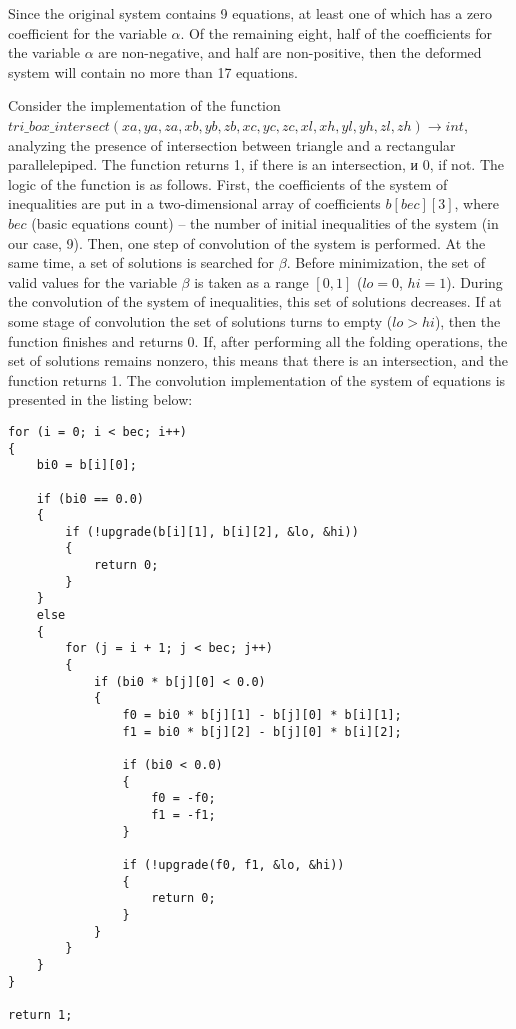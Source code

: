 \documentclass[
11pt,%
tightenlines,%
twoside,%
onecolumn,%
nofloats,%
nobibnotes,%
nofootinbib,%
superscriptaddress,%
noshowpacs,%
centertags]%
{revtex4}
\begin{document}
Since the original system contains 9 equations, at least one of which has a zero coefficient for the variable $\alpha$.
Of the remaining eight, half of the coefficients for the variable $\alpha$ are non-negative, and half are non-positive, then the deformed system will contain no more than 17 equations.

Consider the implementation of the function \\
$tri\_box\_intersect(xa, ya, za, xb, yb, zb, xc, yc, zc, xl, xh, yl, yh, zl, zh) \rightarrow int$, analyzing the presence of intersection between triangle and a rectangular parallelepiped.
The function returns 1, if there is an intersection, и 0, if not.
The logic of the function is as follows.
First, the coefficients of the system of inequalities are put in a two-dimensional array of coefficients $b[bec][3]$, where $bec$ (basic equations count) -- the number of initial inequalities of the system (in our case, 9).
Then, one step of convolution of the system is performed. At the same time, a set of solutions is searched for $\beta$.
Before minimization, the set of valid values for the variable $\beta$ is taken as a range $[0, 1]$ ($lo = 0$, $hi = 1$).
During the convolution of the system of inequalities, this set of solutions decreases.
If at some stage of convolution the set of solutions turns to empty ($lo>hi$), then the function finishes and returns 0.
If, after performing all the folding operations, the set of solutions remains nonzero, this means that there is an intersection, and the function returns 1.
The convolution implementation of the system of equations is presented in the listing below:

\begin{lstlisting}[caption={The initial implementation of the convolution of a system of linear inequalities aimed to determine the intersection of a triangle and a rectangular parallelepiped.},label={lst:prac_intersect_1}]
for (i = 0; i < bec; i++)
{
    bi0 = b[i][0];

    if (bi0 == 0.0)
    {
        if (!upgrade(b[i][1], b[i][2], &lo, &hi))
        {
            return 0;
        }
    }
    else
    {
        for (j = i + 1; j < bec; j++)
        {
            if (bi0 * b[j][0] < 0.0)
            {
                f0 = bi0 * b[j][1] - b[j][0] * b[i][1];
                f1 = bi0 * b[j][2] - b[j][0] * b[i][2];

                if (bi0 < 0.0)
                {
                    f0 = -f0;
                    f1 = -f1;
                }

                if (!upgrade(f0, f1, &lo, &hi))
                {
                    return 0;
                }
            }
        }
    }
}

return 1;
\end{lstlisting}
\end{document}
